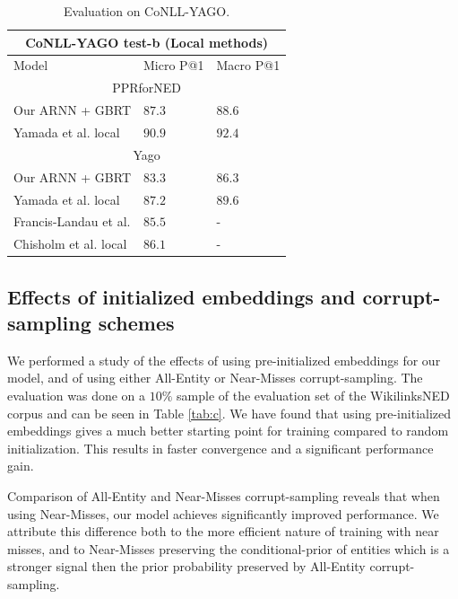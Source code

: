\documentclass[11pt]{article}
\begin{document}
	\begin{table}[h]
		\begin{center}
			\begin{tabular}{|p{3.5cm}| p{1.3cm} p{1.3cm}|}
				\hline \multicolumn{3}{|c|}{CoNLL-YAGO test-b (Local methods)} \\
				\hline Model & Micro P@1 & Macro P@1 \\ 
				\hline \multicolumn{3}{|c|}{PPRforNED} \\
				\hline Our ARNN + GBRT    & $87.3$  & $88.6$ \\
				Yamada et al. local               & $90.9$  & $92.4$ \\
				\hline \multicolumn{3}{|c|}{Yago} \\
				\hline Our ARNN + GBRT    & $83.3$  & $86.3$ \\
				Yamada et al. local               & $87.2$  & $89.6$ \\
				Francis-Landau et al.             & $85.5$  & - \\
				Chisholm et al. local             & $86.1$  & - \\
				\hline
			\end{tabular}
		\end{center}
		\caption{\label{tab:conll} Evaluation on CoNLL-YAGO.}
	\end{table}
	
	\subsection{Effects of initialized embeddings and corrupt-sampling schemes}
	
	We performed a study of the effects of using pre-initialized embeddings for our model, and of using either All-Entity or Near-Misses corrupt-sampling. The evaluation was done on a $10\%$ sample of the evaluation set of the WikilinksNED corpus and can be seen in Table \ref{tab:c}. We have found that using pre-initialized embeddings gives a much better starting point for training compared to random initialization. This results in faster convergence and a significant performance gain.
	
	Comparison of All-Entity and Near-Misses corrupt-sampling reveals that when using Near-Misses, our model achieves significantly improved performance. We attribute this difference both to the more efficient nature of training with near misses, and to Near-Misses preserving the conditional-prior of entities which is a stronger signal then the prior probability preserved by All-Entity corrupt-sampling.
	
\end{document}
